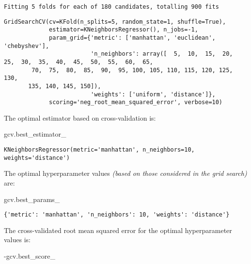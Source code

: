 \documentclass[
  letterpaper,
  DIV=11,
  numbers=noendperiod]{scrreprt}
\newenvironment{Shaded}{\begin{snugshade}}{\end{snugshade}}
\newcommand{\NormalTok}[1]{\textcolor[rgb]{0.00,0.23,0.31}{#1}}
\newcommand{\OperatorTok}[1]{\textcolor[rgb]{0.37,0.37,0.37}{#1}}
\begin{document}
\begin{verbatim}
Fitting 5 folds for each of 180 candidates, totalling 900 fits
\end{verbatim}

\begin{verbatim}
GridSearchCV(cv=KFold(n_splits=5, random_state=1, shuffle=True),
             estimator=KNeighborsRegressor(), n_jobs=-1,
             param_grid={'metric': ['manhattan', 'euclidean', 'chebyshev'],
                         'n_neighbors': array([  5,  10,  15,  20,  25,  30,  35,  40,  45,  50,  55,  60,  65,
        70,  75,  80,  85,  90,  95, 100, 105, 110, 115, 120, 125, 130,
       135, 140, 145, 150]),
                         'weights': ['uniform', 'distance']},
             scoring='neg_root_mean_squared_error', verbose=10)
\end{verbatim}

The optimal estimator based on cross-validation is:

\begin{Shaded}
\begin{Highlighting}[]
\NormalTok{gcv.best\_estimator\_}
\end{Highlighting}
\end{Shaded}

\begin{verbatim}
KNeighborsRegressor(metric='manhattan', n_neighbors=10, weights='distance')
\end{verbatim}

The optimal hyperparameter values \emph{(based on those considered in
the grid search)} are:

\begin{Shaded}
\begin{Highlighting}[]
\NormalTok{gcv.best\_params\_}
\end{Highlighting}
\end{Shaded}

\begin{verbatim}
{'metric': 'manhattan', 'n_neighbors': 10, 'weights': 'distance'}
\end{verbatim}

The cross-validated root mean squared error for the optimal
hyperparameter values is:

\begin{Shaded}
\begin{Highlighting}[]
\OperatorTok{{-}}\NormalTok{gcv.best\_score\_}
\end{Highlighting}
\end{Shaded}
\end{document}
